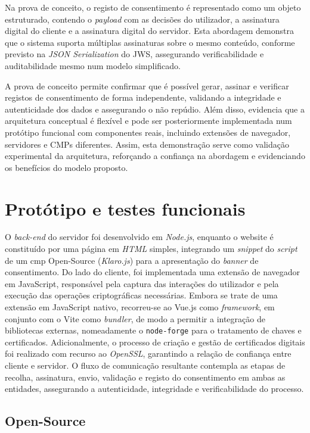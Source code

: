 Na prova de conceito, o registo de consentimento é representado como um objeto estruturado, contendo o \textit{payload} com as decisões do utilizador, a assinatura digital do cliente e a assinatura digital do servidor. Esta abordagem demonstra que o sistema suporta múltiplas assinaturas sobre o mesmo conteúdo, conforme previsto na \textit{JSON Serialization} do JWS, assegurando verificabilidade e auditabilidade mesmo num modelo simplificado.

A prova de conceito permite confirmar que é possível gerar, assinar e verificar registos de consentimento de forma independente, validando a integridade e autenticidade dos dados e assegurando o não repúdio. Além disso, evidencia que a arquitetura conceptual é flexível e pode ser posteriormente implementada num protótipo funcional com componentes reais, incluindo extensões de navegador, servidores e CMPs diferentes. Assim, esta demonstração serve como validação experimental da arquitetura, reforçando a confiança na abordagem e evidenciando os benefícios do modelo proposto.
\section{Protótipo e testes funcionais}

O \textit{back-end} do servidor foi desenvolvido em \textit{Node.js}, enquanto o website é constituído por uma página em \textit{HTML} simples, integrando um \textit{snippet} do \textit{script} de um \acrshort{cmp} Open-Source (\textit{Klaro.js}) para a apresentação do \textit{banner} de consentimento.
Do lado do cliente, foi implementada uma extensão de navegador em JavaScript, responsável pela captura das interações do utilizador e pela execução das operações criptográficas necessárias. Embora se trate de uma extensão em JavaScript nativo, recorreu-se ao Vue.js como \textit{framework}, em conjunto com o Vite como \textit{bundler}, de modo a permitir a integração de bibliotecas externas, nomeadamente o \texttt{node-forge} para o tratamento de chaves e certificados. Adicionalmente, o processo de criação e gestão de certificados digitais foi realizado com recurso ao \textit{OpenSSL}, garantindo a relação de confiança entre cliente e servidor. O fluxo de comunicação resultante contempla as etapas de recolha, assinatura, envio, validação e registo do consentimento em ambas as entidades, assegurando a autenticidade, integridade e verificabilidade do processo.

\subsection{Open-Source}

